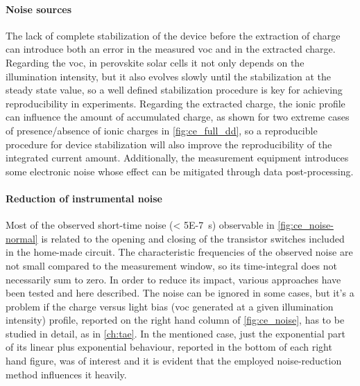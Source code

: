 	\paragraph{Noise sources} \label{ce_noise}
	The lack of complete stabilization of the device before the extraction of charge can introduce both an error in the measured \gls{voc} and in the extracted charge.
	Regarding the \gls{voc}, in perovskite solar cells it not only depends on the illumination intensity, but it also evolves slowly until the stabilization at the steady state value, so a well defined stabilization procedure is key for achieving reproducibility in  experiments.
	Regarding the extracted charge, the ionic profile can influence the amount of accumulated charge, as shown for two extreme cases of presence/absence of ionic charges in \cref{fig:ce_full_dd}, so a reproducible procedure for device stabilization will also improve the reproducibility of the integrated current amount.
	Additionally, the measurement equipment introduces some electronic noise whose effect can be mitigated through data post-processing.

	\paragraph{Reduction of instrumental noise}\label{r_ce_noise}
	Most of the observed short-time noise (\SI{< 5E-7}{\s}) observable in \cref{fig:ce_noise-normal} is related to the opening and closing of the transistor switches included in the home-made circuit. The characteristic frequencies of the observed noise are not small compared to the measurement window, so its time-integral does not necessarily sum to zero.
	In order to reduce its impact, various approaches have been tested and here described.
	The noise can be ignored in some cases, but it's a problem if the charge versus light bias (\gls{voc} generated at a given illumination intensity) profile, reported on the right hand column of \cref{fig:ce_noise}, has to be studied in detail, as in \cref{ch:tae}.
	In the mentioned case, just the exponential part of its linear plus exponential behaviour, reported in the bottom of each right hand figure, was of interest and it is evident that the employed noise-reduction method influences it heavily.
	
